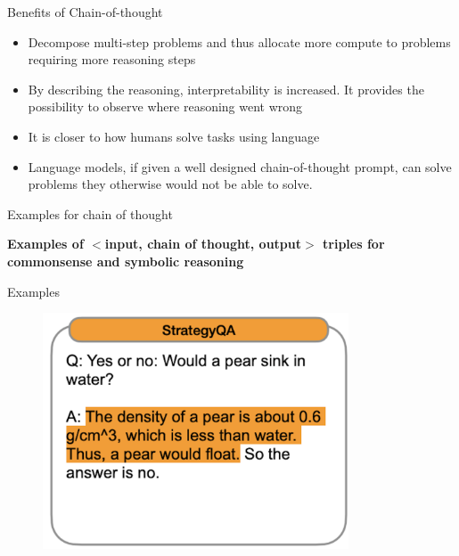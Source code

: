 

\begin{vbframe}{Benefits of Chain-of-thought}

\vfill

\begin{itemize}
    \item Decompose multi-step problems and thus allocate more compute to problems requiring more reasoning steps
    \item By describing the reasoning, interpretability is increased. It provides the possibility to observe where reasoning went wrong
    \item It is closer to how humans solve tasks using language
    \item Language models, if
given a well designed chain-of-thought prompt, can
    solve problems they otherwise would not be able to solve.
\end{itemize}

\vfill

\end{vbframe}



\begin{vbframe}{Examples for chain of thought}

\vfill

\textbf{Examples of $<$input, chain of thought, output$>$ triples for  commonsense and symbolic reasoning}



\vfill

\end{vbframe}


\begin{vbframe}{Examples}

\vfill

\begin{figure}
    \centering
    \includegraphics[height=7cm]{figure/cotex1.png}
\end{figure}

\vfill

\end{vbframe}

